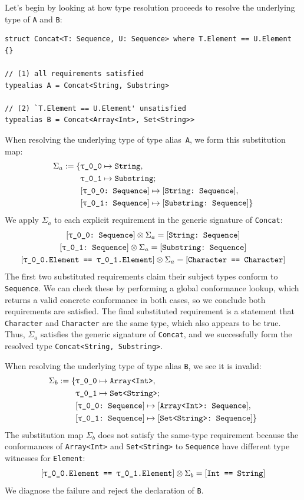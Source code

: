 \documentclass[../generics]{subfiles}
\begin{document}
\begin{example}\label{concat example}
Let's begin by looking at how type resolution proceeds to resolve the underlying type of \texttt{A} and \texttt{B}:
\begin{Verbatim}
struct Concat<T: Sequence, U: Sequence> where T.Element == U.Element {}

// (1) all requirements satisfied
typealias A = Concat<String, Substring>

// (2) `T.Element == U.Element' unsatisfied
typealias B = Concat<Array<Int>, Set<String>>
\end{Verbatim}
When resolving the underlying type of type alias~\texttt{A}, we form this substitution map:
\begin{align*}
\Sigma_a := \SubstMapC{
&\SubstType{\rT}{String},\\
&\SubstType{\rU}{Substring}
}{
\\
&\SubstConf{\rT}{String}{Sequence},\\
&\SubstConf{\rU}{Substring}{Sequence}
}
\end{align*}
We apply $\Sigma_a$ to each explicit requirement in the generic signature of \texttt{Concat}:
\begin{gather*}
\rTSequence\otimes\Sigma_a = \ConfReq{String}{Sequence}\\
\rUSequence\otimes\Sigma_a = \ConfReq{Substring}{Sequence}\\
\SameReq{\rT.Element}{\rU.Element}\otimes\Sigma_a = \SameReq{Character}{Character}
\end{gather*}
The first two substituted requirements claim their subject types conform to \texttt{Sequence}. We can check these by performing a global conformance lookup, which returns a valid concrete conformance in both cases, so we conclude both requirements are satisfied. The final substituted requirement is a statement that \texttt{Character} and \texttt{Character} are the same type, which also appears to be true. Thus, $\Sigma_a$ satisfies the generic signature of \texttt{Concat}, and we successfully form the resolved type \texttt{Concat<String, Substring>}.

When resolving the underlying type of type alias \texttt{B}, we see it is invalid:
\begin{align*}
\Sigma_b := \SubstMapC{
&\SubstType{\rT}{Array<Int>},\\
&\SubstType{\rU}{Set<String>}
}{
\\
&\SubstConf{\rT}{Array<Int>}{Sequence},\\
&\SubstConf{\rU}{Set<String>}{Sequence}
}
\end{align*}
The substitution map $\Sigma_b$ does not satisfy the same-type requirement because the conformances of \texttt{Array<Int>} and \texttt{Set<String>} to \texttt{Sequence} have different type witnesses for \texttt{Element}:
\[\SameReq{\rT.Element}{\rU.Element}\otimes\Sigma_b = \SameReq{Int}{String}\]
We diagnose the failure and reject the declaration of \texttt{B}.
\end{example}
\end{document}
